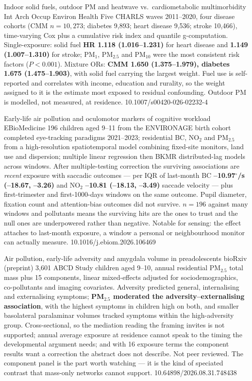 \documentclass[10pt]{article}
\begin{document}
{Indoor solid fuels, outdoor PM and heatwave vs.\ cardiometabolic multimorbidity}
{Int Arch Occup Environ Health}
{Five CHARLS waves 2011--2020, four disease cohorts (CMM $n=10{,}273$; diabetes 9{,}893;
heart disease 9{,}536; stroke 10{,}466), time-varying Cox plus a cumulative risk index and
quantile g-computation. Single-exposure: solid fuel \textbf{HR 1.118 (1.016--1.231)} for
heart disease and \textbf{1.149 (1.007--1.310)} for stroke; PM$_1$, PM$_{2.5}$ and PM$_{10}$
were the most consistent risk factors ($P<0.001$). Mixture ORs: \textbf{CMM 1.650
(1.375--1.979), diabetes 1.675 (1.475--1.903)}, with solid fuel carrying the largest weight.
Fuel use is self-reported and correlates with income, education and rurality, so the weight
assigned to it is the estimate most exposed to residual confounding. Outdoor PM is modelled,
not measured, at residence.}
{10.1007/s00420-026-02232-4}


{Early-life air pollution and oculomotor markers of cognitive workload}
{EBioMedicine}
{196 children aged 9--11 from the ENVIRONAGE birth cohort completed eye-tracking paradigms
2021--2023; residential BC, NO$_2$ and PM$_{2.5}$ from a high-resolution spatiotemporal
model combining fixed-site monitors, land use and dispersion; multiple linear regression
then BKMR distributed-lag models across windows. After multiple-testing correction the
surviving associations are \emph{recent} exposure with saccadic outcomes --- per IQR of
last-month BC \textbf{--10.97$^\circ$/s (--18.67, --3.26)} and NO$_2$ \textbf{--10.81
(--18.13, --3.49)} saccade velocity --- plus first-trimester and first-1000-days windows on
the same outcome. Pupil diameter, fixation count and attention-bias outcomes did not
survive. $n=196$ against many windows and pollutants means the surviving hits are the ones
to trust and the null ones are underpowered rather than negative. Notable for sensing: the
effect attaches to last-month exposure, a window a personal or neighbourhood monitor can
actually measure.}
{10.1016/j.ebiom.2026.106469}

{Air pollution, early-life adversity and amygdala volume in preadolescents}
{bioRxiv (preprint)}
{3{,}601 ABCD Study children aged 9--10, annual residential PM$_{2.5}$ total mass plus 15
components, linear mixed-effects adjusted for sociodemographics, co-pollutants and imaging
covariates. Adversity predicted general, internalising and externalising symptoms;
\textbf{PM$_{2.5}$ moderated the adversity--externalising association}, with the highest
symptoms in children high on both, and smaller basolateral paralaminar volumes tracked
symptoms within the high-adversity group. Cross-sectional, so the mediation reading the
framing invites is not supported; annual average exposure at residence cannot speak to the
timing the developmental argument needs; and with 16 exposure terms the component results
want a correction the abstract does not describe. Not peer reviewed. The component panel is
the part worth watching --- it is the kind of speciated contrast that mass-only networks
cannot support.}
{10.64898/2026.08.31.748438}
\end{document}
